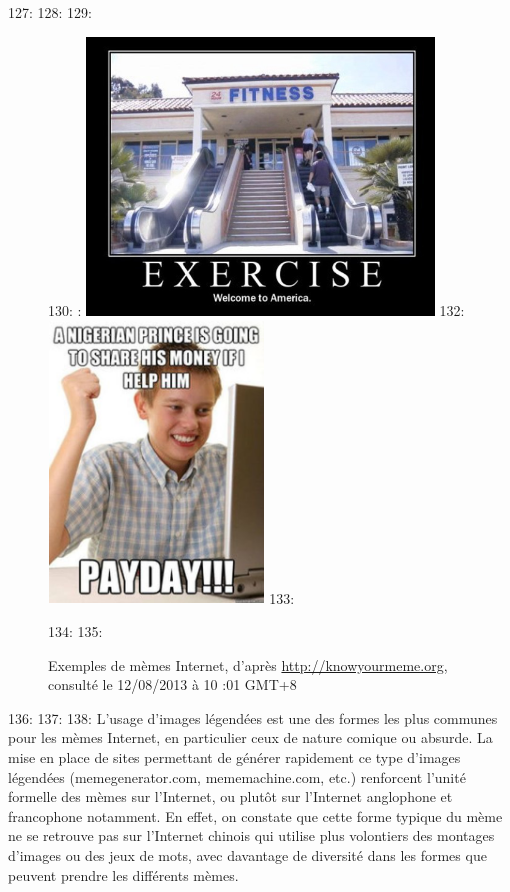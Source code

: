 127: 
128: 
129: \begin{figure}[h]
130:     :     \includegraphics[width=3.6335in,height=2.9114in]{figures/chap2/chapitre2-img3.jpg}
132:     \includegraphics[width=2.2559in,height=2.9449in]{figures/chap2/chapitre2-img4.jpg}
133:     \caption[Exemples de m\`emes internet]{Exemples de m\`emes Internet, d{\textquoteright}apr\`es \url{http://knowyourmeme.org}, consult\'e le 12/08/2013 \`a 10 :01 GMT+8}
134:     \label{fig:memes-examples}
135: \end{figure}
136: 
137: 
138: L{\textquoteright}usage d{\textquoteright}images l\'egend\'ees est une des formes les plus communes pour les m\`emes Internet, en particulier ceux de nature comique ou absurde. La mise en place de sites permettant de g\'en\'erer rapidement ce type d{\textquoteright}images l\'egend\'ees (memegenerator.com, mememachine.com, etc.) renforcent l{\textquoteright}unit\'e formelle des m\`emes sur l{\textquoteright}Internet, ou plut\^ot sur l{\textquoteright}Internet anglophone et francophone notamment. En effet, on constate que cette forme typique du m\`eme ne se retrouve pas sur l{\textquoteright}Internet chinois qui utilise plus volontiers des montages d{\textquoteright}images ou des jeux de mots, avec davantage de diversit\'e dans les formes que peuvent prendre les diff\'erents m\`emes.
